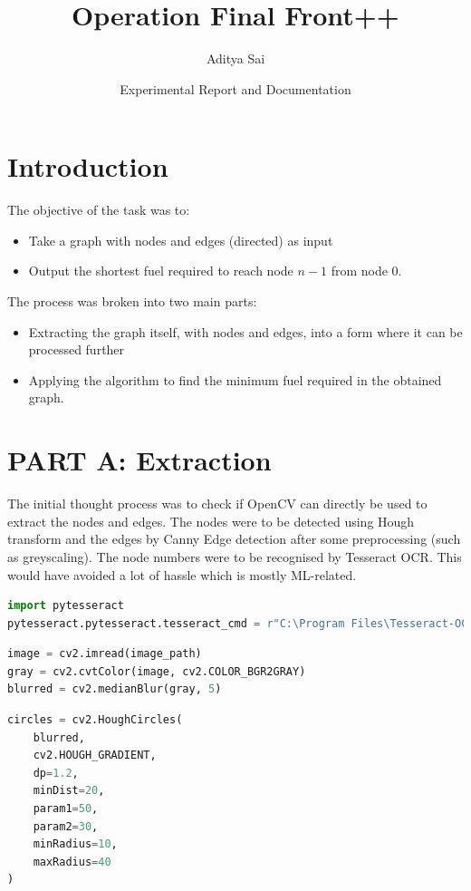 \documentclass{article}
\title{Operation Final Front++}
\author{Aditya Sai}
\date{Experimental Report and Documentation}
\begin{document}
\maketitle

\section{Introduction}

The objective of the task was to:
\begin{itemize}
    \item Take a graph with nodes and edges (directed) as input
    \item Output the shortest fuel required to reach node $n-1$ from node $0$.
\end{itemize}

The process was broken into two main parts:
\begin{itemize}
    \item Extracting the graph itself, with nodes and edges, into a form where it can be processed further
    \item Applying the algorithm to find the minimum fuel required in the obtained graph.
\end{itemize}

\section{PART A: Extraction}
The initial thought process was to check if OpenCV can directly be used to extract the nodes and edges. The nodes were to be detected using Hough transform and the edges by Canny Edge detection after some preprocessing (such as greyscaling). The node numbers were to be recognised by Tesseract OCR. This would have avoided a lot of hassle which is mostly ML-related.

\begin{lstlisting}[language=Python, caption=calling tesseract OCR]
import pytesseract
pytesseract.pytesseract.tesseract_cmd = r"C:\Program Files\Tesseract-OCR\tesseract.exe"
\end{lstlisting}

\begin{lstlisting}[language=Python, caption=Preprocessing]
image = cv2.imread(image_path)
gray = cv2.cvtColor(image, cv2.COLOR_BGR2GRAY)
blurred = cv2.medianBlur(gray, 5)
\end{lstlisting}

\begin{lstlisting}[language=Python, caption=Detecting circles]
circles = cv2.HoughCircles(
    blurred,
    cv2.HOUGH_GRADIENT,
    dp=1.2,
    minDist=20,
    param1=50,
    param2=30,
    minRadius=10,
    maxRadius=40
)
\end{lstlisting}
\end{document}
